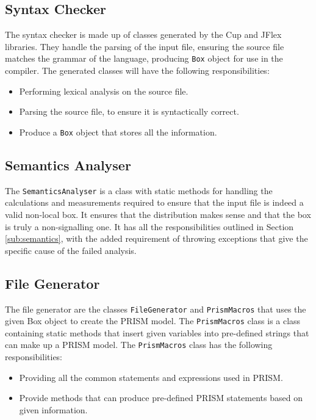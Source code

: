 \documentclass[report.tex]{subfiles}
\begin{document}
\subsection{Syntax Checker} %
\label{sub:syntax_checker}
The syntax checker is made up of classes generated by the Cup and JFlex
libraries. They handle the parsing of the input file, ensuring the source file
matches the grammar of the language, producing \texttt{Box} object for use in
the compiler. The generated classes will have the following responsibilities:
\begin{itemize}
    \item Performing lexical analysis on the source file.
    \item Parsing the source file, to ensure it is syntactically correct.
    \item Produce a \texttt{Box} object that stores all the information.
\end{itemize}

\subsection{Semantics Analyser} %
\label{sub:semantics_analyser}
The \texttt{SemanticsAnalyser} is a class with static methods for handling the
calculations and measurements required to ensure that the input file is indeed a
valid non-local box. It ensures that the distribution makes sense and that the
box is truly a non-signalling one. It has all the responsibilities outlined in
Section \ref{sub:semantics}, with the added requirement of throwing exceptions
that give the specific cause of the failed analysis.

\subsection{File Generator} %
\label{sub:file_generator}
The file generator are the classes \texttt{FileGenerator} and
\texttt{PrismMacros} that uses the given Box object to create the PRISM model.
The \texttt{PrismMacros} class is a class containing static methods that insert
given variables into pre-defined strings that can make up a PRISM model.
The \texttt{PrismMacros} class has the following responsibilities:
\begin{itemize}
    \item Providing all the common statements and expressions used in PRISM.
    \item Provide methods that can produce pre-defined PRISM statements based on
    given information.
\end{itemize}
\end{document}

